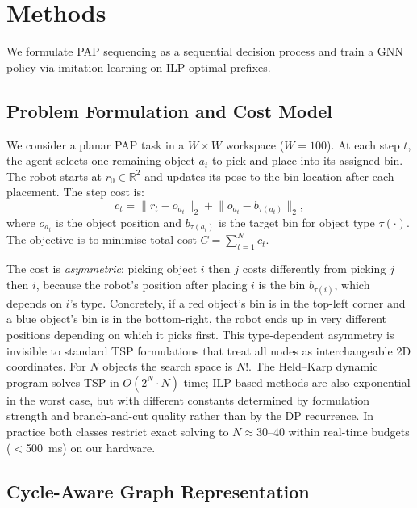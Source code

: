 \documentclass[conference]{IEEEtran}
\begin{document}
\section{Methods}\label{sec:methods}

We formulate PAP sequencing as a sequential decision process and train a GNN policy via imitation learning on ILP-optimal prefixes.

\subsection{Problem Formulation and Cost Model}

We consider a planar PAP task in a $W \times W$ workspace ($W=100$). At each step $t$, the agent selects one remaining object $a_t$ to pick and place into its assigned bin. The robot starts at $r_0 \in \mathbb{R}^2$ and updates its pose to the bin location after each placement. The step cost is:
\begin{equation}
c_t = \lVert r_t - o_{a_t} \rVert_2 + \lVert o_{a_t} - b_{\tau(a_t)} \rVert_2,
\end{equation}
where $o_{a_t}$ is the object position and $b_{\tau(a_t)}$ is the target bin for object type $\tau(\cdot)$. The objective is to minimise total cost $C = \sum_{t=1}^{N} c_t$.

The cost is \emph{asymmetric}: picking object $i$ then $j$ costs differently from picking $j$ then $i$, because the robot's position after placing $i$ is the bin $b_{\tau(i)}$, which depends on $i$'s type. Concretely, if a red object's bin is in the top-left corner and a blue object's bin is in the bottom-right, the robot ends up in very different positions depending on which it picks first. This type-dependent asymmetry is invisible to standard TSP formulations that treat all nodes as interchangeable 2D coordinates. For $N$ objects the search space is $N!$. The Held--Karp dynamic program \cite{held1962dp} solves TSP in $O(2^N \cdot N)$ time; ILP-based methods are also exponential in the worst case, but with different constants determined by formulation strength and branch-and-cut quality rather than by the DP recurrence. In practice both classes restrict exact solving to $N \approx 30$--$40$ within real-time budgets ($<$500~ms) on our hardware.

\subsection{Cycle-Aware Graph Representation}
\end{document}
